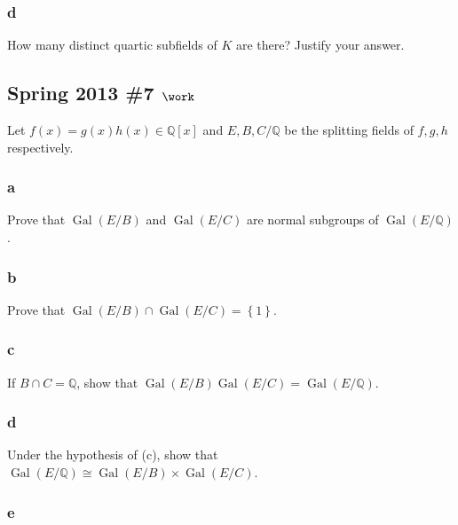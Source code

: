 \hypertarget{d-12}{%
\subsubsection{d}\label{d-12}}

How many distinct quartic subfields of \(K\) are there? Justify your
answer.

\hypertarget{spring-2013-7-work}{%
\subsection{\texorpdfstring{Spring 2013 \#7
\(\work\)}{Spring 2013 \#7 \textbackslash work}}\label{spring-2013-7-work}}

Let \(f(x) = g(x) h(x) \in {\mathbb{Q}}[x]\) and \(E,B,C/{\mathbb{Q}}\)
be the splitting fields of \(f,g,h\) respectively.

\hypertarget{a-80}{%
\subsubsection{a}\label{a-80}}

Prove that \(\operatorname{Gal}(E/B)\) and \(\operatorname{Gal}(E/C)\)
are normal subgroups of \(\operatorname{Gal}(E/{\mathbb{Q}})\).

\hypertarget{b-70}{%
\subsubsection{b}\label{b-70}}

Prove that
\(\operatorname{Gal}(E/B) \cap\operatorname{Gal}(E/C) = \left\{{1}\right\}\).

\hypertarget{c-47}{%
\subsubsection{c}\label{c-47}}

If \(B\cap C = {\mathbb{Q}}\), show that
\(\operatorname{Gal}(E/B) \operatorname{Gal}(E/C) = \operatorname{Gal}(E/{\mathbb{Q}})\).

\hypertarget{d-13}{%
\subsubsection{d}\label{d-13}}

Under the hypothesis of (c), show that
\(\operatorname{Gal}(E/{\mathbb{Q}}) \cong \operatorname{Gal}(E/B) \times \operatorname{Gal}(E/C)\).

\hypertarget{e-1}{%
\subsubsection{e}\label{e-1}}

